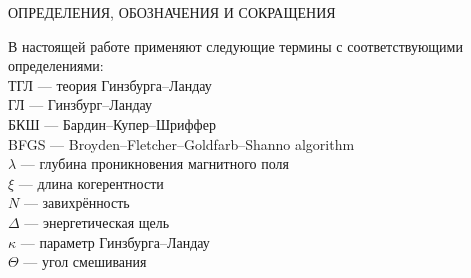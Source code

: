 \begin{center}
	ОПРЕДЕЛЕНИЯ, ОБОЗНАЧЕНИЯ И СОКРАЩЕНИЯ
\end{center}

В настоящей работе применяют следующие термины с соответствующими 
определениями: \\
ТГЛ --- теория Гинзбурга--Ландау \\
ГЛ --- Гинзбург--Ландау \\
БКШ --- Бардин--Купер--Шриффер \\
BFGS --- Broyden--Fletcher--Goldfarb--Shanno algorithm \\
\( \lambda \) --- глубина проникновения магнитного поля \\
\( \xi \) --- длина когерентности \\
\( N \) --- завихрённость \\
\( \Delta \) --- энергетическая щель \\
\( \kappa \) --- параметр Гинзбурга--Ландау \\
\( \Theta \) --- угол смешивания \\

\newpage
